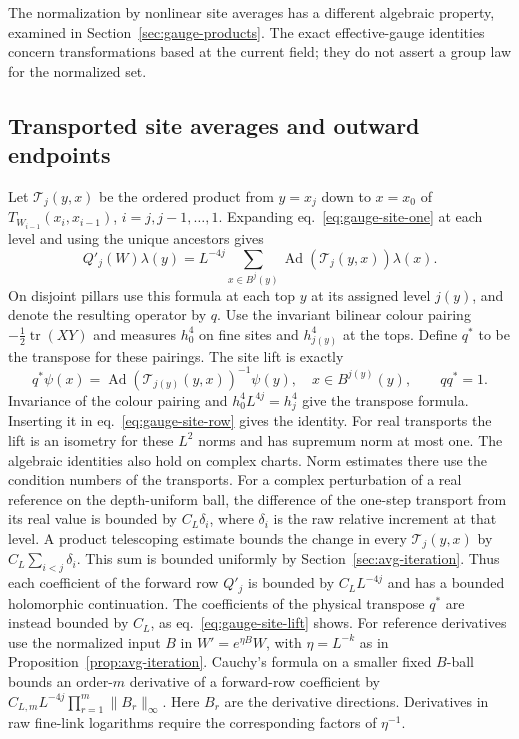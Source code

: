 \documentclass[11pt,letterpaper,reqno]{amsart}
\numberwithin{equation}{section}
\renewcommand{\eqref}[1]{\textup{eq.~\ref{#1}}}
\theoremstyle{definition}
\theoremstyle{remark}
\begin{document}
The normalization by nonlinear site averages has a different algebraic
property, examined in Section~\ref{sec:gauge-products}. The exact
effective-gauge identities concern transformations based at the current
field; they do not assert a group law for the normalized set.

\subsection{Transported site averages and outward endpoints}

Let \(\mathcal T_j(y,x)\) be the ordered product from \(y=x_j\)
down to \(x=x_0\) of \(T_{W_{i-1}}(x_i,x_{i-1})\),
\(i=j,j-1,\ldots,1\). Expanding \eqref{eq:gauge-site-one}
at each level and using the unique ancestors gives
\begin{equation}\label{eq:gauge-site-row}
 Q'_j(W)\lambda(y)=L^{-4j}\sum_{x\in B^j(y)}
       \operatorname{Ad}(\mathcal T_j(y,x))\lambda(x).
\end{equation}
On disjoint pillars use this formula at each top \(y\) at its
assigned level \(j(y)\), and denote the resulting operator by \(q\).
Use the invariant bilinear colour pairing
\(-\tfrac12\operatorname{tr}(XY)\) and measures \(h_0^4\) on fine
sites and \(h_{j(y)}^4\) at the tops. Define \(q^\ast\) to be the
transpose for these pairings. The site lift is exactly
\begin{equation}\label{eq:gauge-site-lift}
 q^\ast\psi(x)=\operatorname{Ad}(\mathcal T_{j(y)}(y,x))^{-1}\psi(y),
   \quad x\in B^{j(y)}(y),\qquad qq^\ast=1 .
\end{equation}
Invariance of the colour pairing and \(h_0^4L^{4j}=h_j^4\)
give the transpose formula. Inserting it in \eqref{eq:gauge-site-row}
gives the identity. For real transports the lift is an isometry
for these \(L^2\) norms and has supremum norm at most one. The algebraic
identities also hold on complex charts. Norm estimates there use the
condition numbers of the transports. For a complex perturbation of a
real reference on the depth-uniform ball, the difference of the
one-step transport from its real value is bounded by \(C_L\delta_i\),
where \(\delta_i\) is the raw relative increment at that level.
A product telescoping estimate bounds the change in every
\(\mathcal T_j(y,x)\) by \(C_L\sum_{i<j}\delta_i\). This sum is
bounded uniformly by Section~\ref{sec:avg-iteration}. Thus each
coefficient of the forward row \(Q'_j\) is bounded by
\(C_L L^{-4j}\) and has a bounded holomorphic continuation.
The coefficients of the physical transpose \(q^\ast\) are instead
bounded by \(C_L\), as \eqref{eq:gauge-site-lift} shows.
For reference derivatives use the normalized input \(B\) in
\(W'=e^{\eta B}W\), with \(\eta=L^{-k}\) as in
Proposition~\ref{prop:avg-iteration}. Cauchy's formula on a smaller
fixed \(B\)-ball bounds an order-\(m\) derivative of a forward-row
coefficient by \(C_{L,m}L^{-4j}\prod_{r=1}^m\|B_r\|_\infty\).
Here \(B_r\) are the derivative directions. Derivatives in raw
fine-link logarithms require the corresponding factors of
\(\eta^{-1}\).
\end{document}
